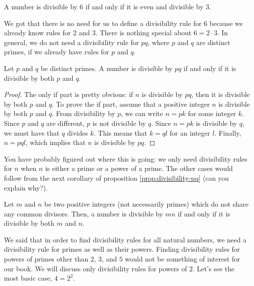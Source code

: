 \begin{proposition}[Divisibility by $6$]
A number is divisible by $6$ if and only if it is even and divisible by $3$.
\end{proposition}

We got that there is no need for us to define a divisibility rule for $6$ because we already know rules for $2$ and $3$. There is nothing special about $6=2 \cdot 3$. In general, we do not need a divisibility rule for $pq$, where $p$ and $q$ are distinct primes, if we already have rules for $p$ and $q$.

\begin{proposition}[Divisibility by $pq$] \label{prop:divisibility-pq}
Let $p$ and $q$ be distinct primes. A number is divisible by $pq$ if and only if it is divisible by both $p$ and $q$.
\end{proposition}

\begin{proof}
The only if part is pretty obvious: if $n$ is divisible by $pq$, then it is divisible by both $p$ and $q$. To prove the if part, assume that a positive integer $n$ is divisible by both $p$ and $q$. From divisibility by $p$, we can write $n=pk$ for some integer $k$. Since $p$ and $q$ are different, $p$ is not divisible by $q$. Since $n=pk$ is divisible by $q$, we must have that $q$ divides $k$. This means that $k=ql$ for an integer $l$. Finally, $n=pql$, which implies that $n$ is divisible by $pq$.
\end{proof}


You have probably figured out where this is going: we only need divisibility rules for $n$ when $n$ is either a prime or a power of a prime. The other cases would follow from the next corollary of proposition \eqref{prop:divisibility-pq} (can you explain why?).

\begin{corollary}
Let $m$ and $n$ be two positive integers (not necessarily primes) which do not share any common divisors. Then, a number is divisible by $mn$ if and only if it is divisible by both $m$ and $n$.
\end{corollary}

We said that in order to find divisibility rules for all natural numbers, we need a divisibility rule for primes as well as their powers. Finding divisibility rules for powers of primes other than $2$, $3$, and $5$ would not be something of interest for our book. We will discuss only divisibility rules for powers of $2$. Let's see the most basic case, $4=2^2$.

